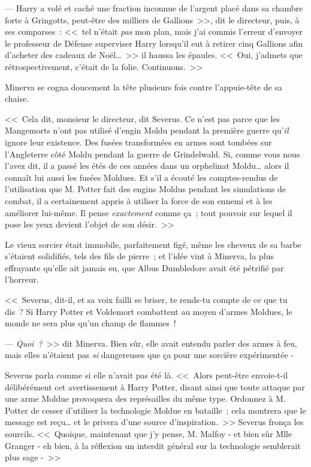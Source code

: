 --- Harry a volé et caché une fraction inconnue de l'argent placé dans sa chambre forte à Gringotts, peut-être des milliers de Gallions~>>, dit le directeur, puis, à ses comparses~: <<~tel n'était \emph{pas} mon plan, mais j'ai commis l'erreur d'envoyer le professeur de Défense superviser Harry lorsqu'il eut à retirer cinq Gallions afin d'acheter des cadeaux de Noël…~>> il haussa les épaules. <<~Oui, j'admets que rétrospectivement, c'était de la folie. Continuons.~>>

Minerva se cogna doucement la tête plusieurs fois contre l'appuie-tête de sa chaise.

<<~Cela dit, monsieur le directeur, dit Severus. Ce n'est pas parce que les Mangemorts n'ont pas utilisé d'engin Moldu pendant la première guerre qu'\emph{il} ignore leur existence. Des fusées transformées en armes sont tombées sur l'Angleterre côté Moldu pendant la guerre de Grindelwald. Si, comme vous nous l'avez dit, il a passé les étés de ces années dans un orphelinat Moldu… alors il connaît lui aussi les fusées Moldues. Et s'il a écouté les comptes-rendus de l'utilisation que M. Potter fait des engins Moldus pendant les simulations de combat, il a certainement appris à utiliser la force de son ennemi et à les améliorer lui-même. Il pense \emph{exactement} comme ça~; tout pouvoir sur lequel il pose les yeux devient l'objet de son désir.~>>

Le vieux sorcier était immobile, parfaitement figé, même les cheveux de sa barbe s'étaient solidifiés, tels des fils de pierre~; et l'idée vint à Minerva, la plus effrayante qu'elle ait jamais eu, que Albus Dumbledore avait été pétrifié par l'horreur.

<<~Severus, dit-il, et sa voix failli se briser, te rends-tu compte de ce que tu dis~? Si Harry Potter et Voldemort combattent au moyen d'armes Moldues, le monde ne sera plus qu'un champ de flammes~!

--- \emph{Quoi~?}~>> dit Minerva. Bien sûr, elle avait entendu parler des armes à feu, mais elles n'étaient pas \emph{si} dangereuses que ça pour une sorcière expérimentée -

Severus parla comme si elle n'avait pas été là. <<~Alors peut-être envoie-t-il délibérément cet avertissement à Harry Potter, disant ainsi que toute attaque par une arme Moldue provoquera des représailles du même type. Ordonnez à M. Potter de cesser d'utiliser la technologie Moldue en bataille~; cela montrera que le message est reçu… et le privera d'une source d'inspiration.~>> Severus fronça les sourcils. <<~Quoique, maintenant que j'y pense, M. Malfoy - et bien sûr Mlle Granger - eh bien, à la réflexion un interdit général sur la technologie semblerait plus sage -~>>

